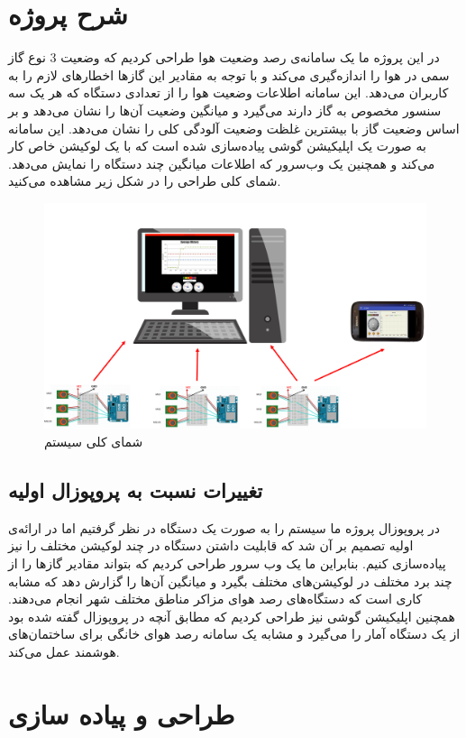 \section{شرح پروژه}
در این پروژه ما یک سامانه‌ی 
رصد وضعیت هوا طراحی کردیم که وضعیت 3 نوع گاز سمی در هوا را اندازه‌‌گیری می‌کند و با توجه به مقادیر این گاز‌ها اخطار‌های لازم را به کاربران می‌دهد. این سامانه اطلاعات وضعیت هوا را از تعدادی دستگاه که هر یک سه سنسور مخصوص به گاز ‌دارند می‌گیرد و میانگین وضعیت آن‌ها را نشان می‌دهد و بر اساس وضعیت گاز با بیشترین غلظت وضعیت آلودگی کلی را نشان می‌دهد. این سامانه به صورت یک اپلیکیشن گوشی پیاده‌سازی شده است که با یک لوکیشن خاص کار می‌کند و همچنین یک وب‌سرور که اطلاعات میانگین چند دستگاه را نمایش می‌دهد. شمای کلی طراحی را در شکل زیر مشاهده می‌کنید. 
\begin{figure}[h!]
	\centering		
 	\includegraphics[width=0.8\linewidth]{figs/design.png}
	\caption{شمای کلی سیستم}
\end{figure}


\subsection{تغییرات نسبت به پروپوزال اولیه}
در پروپوزال پروژه ما سیستم را به صورت یک دستگاه در نظر گرفتیم اما در ارائه‌ی اولیه تصمیم بر آن شد که قابلیت داشتن دستگاه در چند لوکیشن مختلف را نیز پیاده‌سازی کنیم. بنابراین ما یک وب سرور طراحی کردیم که بتواند مقادیر گاز‌ها را از چند برد مختلف در لوکیشن‌های مختلف بگیرد و میانگین آن‌ها را گزارش دهد که مشابه کاری است که دستگاه‌های رصد هوای مزاکر مناطق مختلف شهر انجام می‌دهند. همچنین اپلیکیشن گوشی نیز طراحی کردیم که مطابق آنچه در پروپوزال گفته شده بود از یک دستگاه آمار را می‌گیرد و مشابه یک سامانه رصد هوای خانگی برای ساختمان‌های هوشمند عمل می‌کند.  

\section{طراحی و پیاده سازی}


